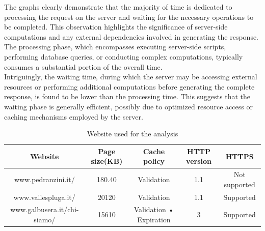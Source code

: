 \documentclass[eng]{class}
\begin{document}
The graphs clearly demonstrate that the majority of time is dedicated to processing the request on the server and waiting for the necessary operations to be completed.
This observation highlights the significance of server-side computations and any external dependencies involved in generating the response.
The processing phase, which encompasses executing server-side scripts, performing database queries,
or conducting complex computations, typically consumes a substantial portion of the overall time.\\
Intriguingly, the waiting time, during which the server may be accessing external resources or performing additional computations
before generating the complete response, is found to be lower than the processing time. This suggests that the waiting phase is generally efficient,
possibly due to optimized resource access or caching mechanisms employed by the server.
\begin{table}[H]
  \tiny
  \centering
  \begin{tabular}{|c|c|c|c|c|}
    \hline
    \linewidth=0cm
    Website                     & Page size(KB) & Cache policy            & HTTP version & HTTPS         \\
    \hline
    www.pedranzini.it/          & 180.40        & Validation              & 1.1          & Not supported \\
    www.vallespluga.it/         & 20120         & Validation              & 1.1          & Supported     \\
    www.galbusera.it/chi-siamo/ & 15610         & Validation • Expiration & 3            & Supported     \\
    \hline
  \end{tabular}
  \caption{Website used for the analysis}
  \label{tab-3}
\end{table}
\end{document}

